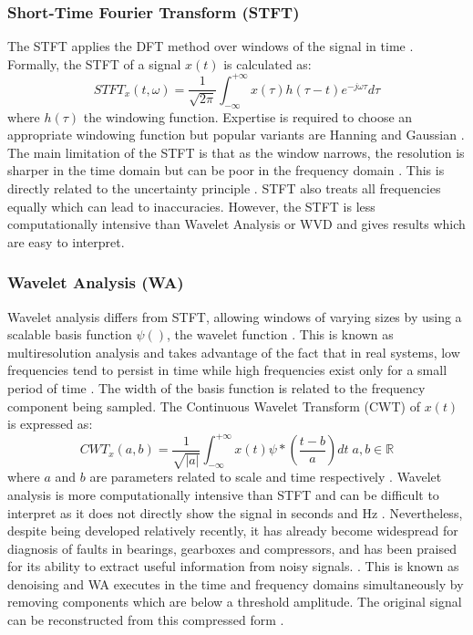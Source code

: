 \documentclass[conference]{IEEEtran}
\newcommand*\abs[1]{\lvert#1\rvert}
\begin{document}
\subsubsection{Short-Time Fourier Transform (STFT)}
The STFT applies the DFT method over windows of the signal in time \cite{DaiGao}\cite{WangChen}.  Formally, the STFT of a signal ${x(t)}$ is calculated as:
\begin{equation*}
STFT_x(t, \omega) = \frac{1}{\sqrt{2\pi}}\int^{+\infty}_{-\infty}x(\tau)h(\tau-t)e^{-j\omega \tau}d\tau
\end{equation*}
where $h(\tau)$ the windowing function. Expertise is required to choose an appropriate windowing function but popular variants are Hanning and Gaussian \cite{Wavelets}\cite{Vibration Book}. The main limitation of the STFT is that as the window narrows, the resolution is sharper in the time domain but can be poor in the frequency domain \cite{DaiGao}. This is directly related to the uncertainty principle \cite{Wavelets}. STFT also treats all frequencies equally which can lead to inaccuracies. However, the STFT is less computationally intensive than Wavelet Analysis or WVD \cite{WangChen} and gives results which are easy to interpret.

\subsubsection{Wavelet Analysis (WA)}
Wavelet analysis differs from STFT, allowing windows of varying sizes by using a scalable basis function $\psi()$, the wavelet function \cite{DaiGao}. This is known as multiresolution analysis and takes advantage of the fact that in real systems, low frequencies tend to persist in time while high frequencies exist only for a small period of time \cite{Wavelets}. The width of the basis function is related to the frequency component being sampled. The Continuous Wavelet Transform (CWT) of $x(t)$ is expressed as:
\begin{equation*}
  CWT_x(a, b) = \frac{1}{\sqrt{\abs{a}}}\int^{+\infty}_{-\infty}x(t)\psi*\left(\frac{t-b}{a}\right)dt\;a, b\in \mathbb{R}
\end{equation*}
where $a$ and $b$ are parameters related to scale and time respectively \cite{WangChen}. Wavelet analysis is more computationally intensive than STFT and can be difficult to interpret as it does not directly show the signal in seconds and Hz \cite{Wavelets}. Nevertheless, despite being developed relatively recently, it has already become widespread for diagnosis of faults in bearings, gearboxes and compressors, and has been praised for its ability to extract useful information from noisy signals. \cite{DaiGao}\cite{WangChen}. This is known as denoising and WA executes in the time and frequency domains simultaneously by removing components which are below a threshold amplitude. The original signal can be reconstructed from this compressed form \cite{Wavelets}\cite{Vibration Book}.
\end{document}
